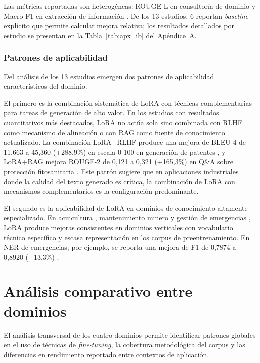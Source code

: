 Las métricas reportadas son heterogéneas: ROUGE-L en consultoría de dominio \parencite{song2025lora} y Macro-F1 en extracción de información \parencite{yang2025hierarchic}. De los 13 estudios, 6 reportan \textit{baseline} explícito que permite calcular mejora relativa; los resultados detallados por estudio se presentan en la Tabla~\ref{tab:apx_ib} del Apéndice~A.

\subsubsection{Patrones de aplicabilidad}

Del análisis de los 13 estudios emergen dos patrones de aplicabilidad característicos del dominio.

El primero es la combinación sistemática de LoRA con técnicas complementarias para tareas de generación de alto valor. En los estudios con resultados cuantitativos más destacados, LoRA no actúa sola sino combinada con RLHF como mecanismo de alineación o con RAG como fuente de conocimiento actualizado. La combinación LoRA+RLHF produce una mejora de BLEU-4 de 11,663 a 45,360 (+288,9\%) en escala 0-100 en generación de patentes \parencite{ren2025patent}, y LoRA+RAG mejora ROUGE-2 de 0,121 a 0,321 (+165,3\%) en Q\&A sobre protección fitosanitaria \parencite{xiong2025lora}. Este patrón sugiere que en aplicaciones industriales donde la calidad del texto generado es crítica, la combinación de LoRA con mecanismos complementarios es la configuración predominante.

El segundo es la aplicabilidad de LoRA en dominios de conocimiento altamente especializado. En acuicultura \parencite{song2025lora}, mantenimiento minero \parencite{cao2025lora} y gestión de emergencias \parencite{zhou2025kg}, LoRA produce mejoras consistentes en dominios verticales con vocabulario técnico específico y escasa representación en los corpus de preentrenamiento. En NER de emergencias, por ejemplo, se reporta una mejora de F1 de 0,7874 a 0,8920 (+13,3\%) \parencite{zhou2025kg}.

\section{Análisis comparativo entre dominios}

El análisis transversal de los cuatro dominios permite identificar patrones globales en el uso de técnicas de \textit{fine-tuning}, la cobertura metodológica del corpus y las diferencias en rendimiento reportado entre contextos de aplicación.

